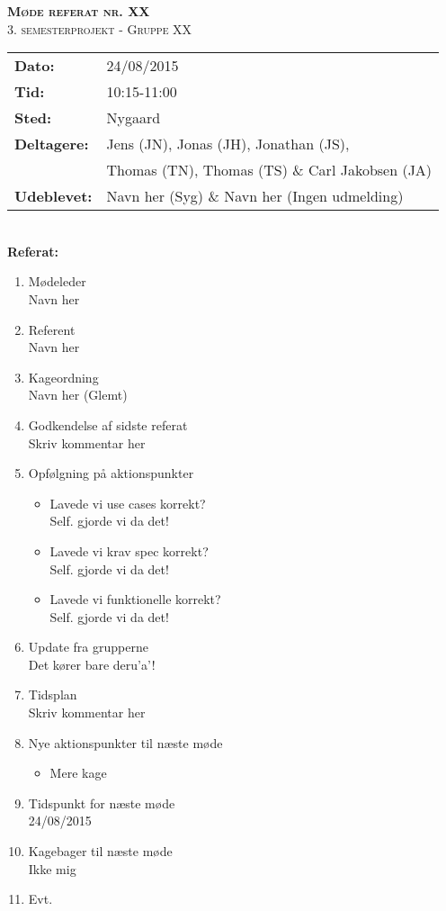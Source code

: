 
\newcommand{\HRule}{\rule{\linewidth}{0.1mm}}


	\begin{center}
		{\huge \bfseries \textsc{Møde referat nr. XX}}\\
		\textsc{\large 3. semesterprojekt - Gruppe XX}\\[0.3cm]
	\end{center}
	\begin{tabular}{ll}
	\large \textbf{Dato:} & 24/08/2015  \\ %
	\large \textbf{Tid:}  & 10:15-11:00 \\ %
	\large \textbf{Sted:} & Nygaard		\\ %
	\large \textbf{Deltagere:} & Jens (JN), Jonas (JH), Jonathan (JS), \\
	\large \textbf & Thomas (TN),  Thomas (TS) \& Carl Jakobsen (JA)\\
	\large \textbf{Udeblevet:} & Navn her (Syg) \& Navn her (Ingen udmelding)	\\
	\end{tabular}\\
	\phantom{\,}\hspace{0.1em} \large \textbf{Referat:}
	\begin{enumerate}
		\itemsep 0.3em 
		\item Mødeleder\\
			Navn her
		\item Referent\\
			Navn her
		\item Kageordning\\
			Navn her (Glemt)
		\item Godkendelse af sidste referat\\
			Skriv kommentar her
		\item Opfølgning på aktionspunkter
		\begin{itemize}
			\itemsep 0.3em 
			\item Lavede vi use cases korrekt?\\
				Self. gjorde vi da det!
			\item Lavede vi krav spec korrekt?\\
				Self. gjorde vi da det!
			\item Lavede vi funktionelle korrekt?\\
				Self. gjorde vi da det!
		\end{itemize}
		\item Update fra grupperne\\
			Det kører bare deru'a'!
		\item Tidsplan\\
			Skriv kommentar her
		\item Nye aktionspunkter til næste møde
		\begin{itemize}
			\itemsep 0.3em 
			\item Mere kage
		\end{itemize}
		\item Tidspunkt for næste møde\\
			24/08/2015
		\item Kagebager til næste møde\\
			Ikke mig
		\item Evt.
	\end{enumerate}
